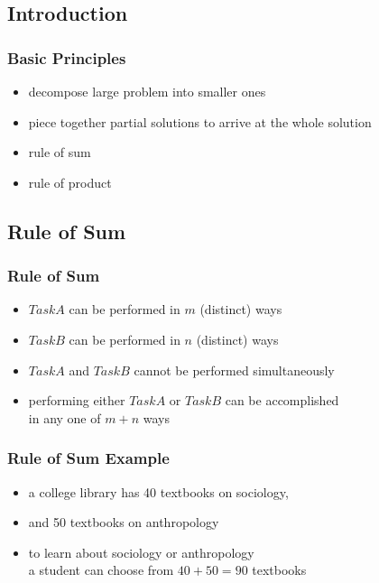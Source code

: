 \documentclass[dvipsnames]{beamer}
\begin{document}
\subsection{Introduction}

\begin{frame}
  \frametitle{Basic Principles}

  \begin{itemize}
    \item decompose large problem into smaller ones
    \item piece together partial solutions to arrive at the whole solution

    \pause
    \bigskip
    \item rule of sum
    \item rule of product
  \end{itemize}
\end{frame}

\subsection{Rule of Sum}

\begin{frame}
  \frametitle{Rule of Sum}

  \begin{itemize}
    \item $TaskA$ can be performed in $m$ (distinct) ways
    \item $TaskB$ can be performed in $n$ (distinct) ways
    \item $TaskA$ and $TaskB$ cannot be performed simultaneously

    \pause
    \bigskip
    \item performing either $TaskA$ or $TaskB$ can be accomplished\\
      in any one of $m+n$ ways
  \end{itemize}
\end{frame}

\begin{frame}
  \frametitle{Rule of Sum Example}

  \begin{itemize}
    \item a college library has 40 textbooks on sociology,
    \item and 50 textbooks on anthropology

    \medskip
    \item to learn about sociology or anthropology\\
      a student can choose from $40 + 50 = 90$ textbooks
  \end{itemize}
\end{frame}
\end{document}
